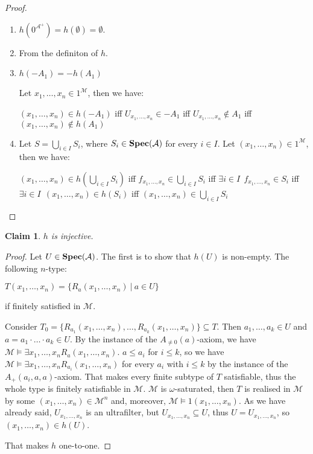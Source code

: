 \documentclass{article}
\theoremstyle{defin}
\theoremstyle{theorem}
\theoremstyle{claim}
\newtheorem{claim}{Claim}
\theoremstyle{prop}
\theoremstyle{lemma}
\theoremstyle{fact}
\theoremstyle{remark}
\theoremstyle{ex}
\theoremstyle{col}
\theoremstyle{question}
\begin{document}
\begin{proof}
$ $

\begin{enumerate}
\item $h(0^{\mathcal{A}^{+}}) = h(\emptyset) = \emptyset$.
\item From the definiton of $h$.
\item $h(- A_1) = - h(A_1)$

Let $x_1, \dots, x_n \in 1^{\mathcal{M}}$, then we have:

\begin{center}
$(x_1, \dots, x_n) \in h(- A_1)$ iff $U_{x_1, \dots, x_n} \in - A_1$ iff $U_{x_1, \dots, x_n} \notin A_1$ iff $(x_1, \dots, x_n) \notin h(A_1)$
\end{center}
\item Let $S = \bigcup \limits_{i \in I} S_i$, where $S_i \in {\bf Spec}(\mathcal{A})$ for every $i \in I$.
Let $(x_1, \dots, x_n) \in 1^{\mathcal{M}}$, then we have:
\begin{center}
$(x_1, \dots, x_n) \in h(\bigcup \limits_{i \in I} S_i)$ iff $f_{x_1, \dots, x_n} \in \bigcup \limits_{i \in I} S_i$ iff $\exists i \in I \:\: f_{x_1, \dots, x_n} \in S_i$ iff $\exists i \in I \:\: (x_1, \dots, x_n) \in h(S_i)$ iff $(x_1, \dots, x_n) \in \bigcup \limits_{i \in I} S_i$
\end{center}
\end{enumerate}
\end{proof}

\begin{claim}
$h$ is injective.
\end{claim}

\begin{proof}
Let $U \in {\bf Spec}(\mathcal{A})$. The first is to show that $h(U)$ is non-empty. The following $n$-type:
\begin{center}
$T(x_1, \dots, x_n) = \{ R_a(x_1, \dots, x_n) \: | \: a \in U \}$
\end{center}
if finitely satisfied in $\mathcal{M}$.

Consider $T_0 = \{ R_{a_1}(x_1, \dots, x_n), \dots, R_{a_k}(x_1, \dots, x_n) \} \subseteq T$. Then $a_1, \dots, a_k \in U$ and $a = a_1 \cdot \dots \cdot a_k \in U$. By the instance of the $A_{\neq 0}(a)$-axiom, we have $\mathcal{M} \models \exists x_1, \dots, x_n R_a(x_1, \dots, x_n)$.
$a \leq a_i$ for $i \leq k$, so we have $\mathcal{M} \models \exists x_1, \dots, x_n R_{a_i}(x_1, \dots, x_n)$ for every $a_i$ with $i \leq k$ by the instance of the $A_{+}(a_i, a, a)$-axiom. That makes every finite subtype of $T$ satisfiable, thus the whole type is finitely satisfiable in $\mathcal{M}$.
$\mathcal{M}$ is $\omega$-saturated, then $T$ is realised in $\mathcal{M}$ by some $(x_1, \dots, x_n) \in \mathcal{M}^n$ and, moreover, $\mathcal{M} \models 1(x_1, \dots, x_n)$. As we have already said, $U_{x_1, \dots, x_n}$ is an ultrafilter, but $U_{x_1, \dots, x_n} \subseteq U$, thus $U = U_{x_1, \dots, x_n}$, so $(x_1, \dots, x_n) \in h(U)$.

That makes $h$ one-to-one.
\end{proof}
\end{document}

